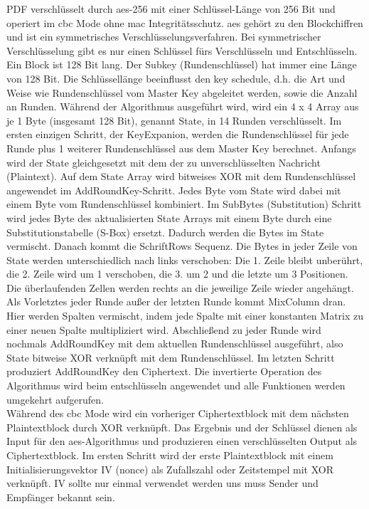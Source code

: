 PDF verschlüsselt durch \gls{aes}-256 mit einer Schlüssel-Länge von 256 Bit und operiert im \gls{cbc} Mode ohne \gls{mac} Integritätsschutz. \gls{aes} gehört zu den Blockchiffren und ist ein symmetrisches Verschlüsselungsverfahren. Bei symmetrischer Verschlüsselung gibt es nur einen Schlüssel fürs Verschlüsseln und Entschlüsseln. Ein Block ist 128 Bit lang. Der Subkey (Rundenschlüssel) hat immer eine Länge von 128 Bit. Die Schlüssellänge beeinflusst den key schedule, d.h. die Art und Weise wie Rundenschlüssel vom Master Key abgeleitet werden, sowie die Anzahl an Runden. Während der Algorithmus ausgeführt wird, wird ein 4 x 4 Array aus je 1 Byte (insgesamt 128 Bit), genannt State, in 14 Runden verschlüsselt. Im ersten einzigen Schritt, der KeyExpanion, werden die Rundenschlüssel für jede Runde plus 1 weiterer Rundenschlüssel aus dem Master Key berechnet. Anfangs wird der State gleichgesetzt mit dem der zu unverschlüsselten Nachricht (Plaintext). Auf dem State Array wird bitweises XOR mit dem Rundenschlüssel angewendet im AddRoundKey-Schritt. Jedes Byte vom State wird dabei mit einem Byte vom Rundenschlüssel kombiniert. Im SubBytes (Substitution) Schritt wird jedes Byte des aktualisierten State Arrays mit einem Byte durch eine Substitutionstabelle (S-Box) ersetzt. Dadurch werden die Bytes im State vermischt. Danach kommt die SchriftRows Sequenz. Die Bytes in jeder Zeile von State werden unterschiedlich nach links verschoben: Die 1. Zeile bleibt unberührt, die 2. Zeile wird um 1 verschoben, die 3. um 2 und die letzte um 3 Positionen. Die überlaufenden Zellen werden rechts an die jeweilige Zeile wieder angehängt. Als Vorletztes jeder Runde außer der letzten Runde kommt MixColumn dran. Hier werden Spalten vermischt, indem jede Spalte mit einer konstanten Matrix zu einer neuen Spalte multipliziert wird. Abschließend zu jeder Runde wird nochmals AddRoundKey mit dem aktuellen Rundenschlüssel ausgeführt, also State bitweise XOR verknüpft mit dem Rundenschlüssel. Im letzten Schritt produziert AddRoundKey den Ciphertext. Die invertierte Operation des Algorithmus wird beim entschlüsseln angewendet und alle Funktionen werden umgekehrt aufgerufen. \cite{intro-crypto, studyflix-aes, simply-aes} \\
Während des \gls{cbc} Mode wird ein vorheriger Ciphertextblock mit dem nächsten Plaintextblock durch XOR verknüpft. Das Ergebnis und der Schlüssel dienen als Input für den \gls{aes}-Algorithmus und produzieren einen verschlüsselten Output als Ciphertextblock. Im ersten Schritt wird der erste Plaintextblock mit einem Initialisierungsvektor IV (nonce) als Zufallszahl oder Zeitstempel mit XOR verknüpft. IV sollte nur einmal verwendet werden uns muss Sender und Empfänger bekannt sein. \cite{crypto-web} \\

